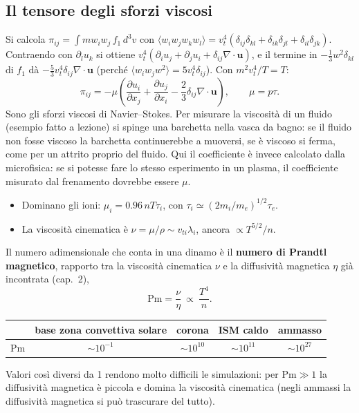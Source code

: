 \subsection{Il tensore degli sforzi viscosi}
Si calcola $\pi_{ij}=\int mw_iw_j\,f_1\,d^3v$ con $\langle w_iw_jw_kw_l\rangle=v_t^4(\delta_{ij}\delta_{kl}+\delta_{ik}\delta_{jl}+\delta_{il}\delta_{jk})$. Contraendo con $\partial_lu_k$ si ottiene $v_t^4(\partial_iu_j+\partial_ju_i+\delta_{ij}\nabla\cdot\mathbf{u})$, e il termine in $-\frac13w^2\delta_{kl}$ di $f_1$ dà $-\frac53v_t^4\delta_{ij}\nabla\cdot\mathbf{u}$ (perché $\langle w_iw_jw^2\rangle=5v_t^4\delta_{ij}$). Con $m^2v_t^4/T=T$:
\begin{equation}
\pi_{ij}=-\mu\left(\frac{\partial u_i}{\partial x_j}+\frac{\partial u_j}{\partial x_i}-\frac23\delta_{ij}\nabla\cdot\mathbf{u}\right),\qquad\mu=p\tau .
\end{equation}
Sono gli sforzi viscosi di Navier--Stokes. Per misurare la viscosità di un fluido (esempio fatto a lezione) si spinge una barchetta nella vasca da bagno: se il fluido non fosse viscoso la barchetta continuerebbe a muoversi, se è viscoso si ferma, come per un attrito proprio del fluido. Qui il coefficiente è invece calcolato dalla microfisica: se si potesse fare lo stesso esperimento in un plasma, il coefficiente misurato dal frenamento dovrebbe essere $\mu$.
\begin{itemize}
\item Dominano gli ioni: $\mu_i=0.96\,nT\tau_i$, con $\tau_i\simeq(2m_i/m_e)^{1/2}\tau_e$.
\item La viscosità cinematica è $\nu=\mu/\rho\sim v_{ti}\lambda_i$, ancora $\propto T^{5/2}/n$.
\end{itemize}
Il numero adimensionale che conta in una dinamo è il \textbf{numero di Prandtl magnetico}, rapporto tra la viscosità cinematica $\nu$ e la diffusività magnetica $\eta$ già incontrata (cap.~2),
\begin{equation}
\mathrm{Pm}=\frac\nu\eta\ \propto\ \frac{T^4}{n}.
\end{equation}
\begin{center}
\small
\begin{tabular}{|l|c|c|c|c|}
\hline
 & base zona convettiva solare & corona & ISM caldo & ammasso\\
\hline
$\mathrm{Pm}$ & $\sim10^{-1}$ & $\sim10^{10}$ & $\sim10^{11}$ & $\sim10^{27}$\\
\hline
\end{tabular}
\end{center}
Valori così diversi da 1 rendono molto difficili le simulazioni: per $\mathrm{Pm}\gg1$ la diffusività magnetica è piccola e domina la viscosità cinematica (negli ammassi la diffusività magnetica si può trascurare del tutto).

